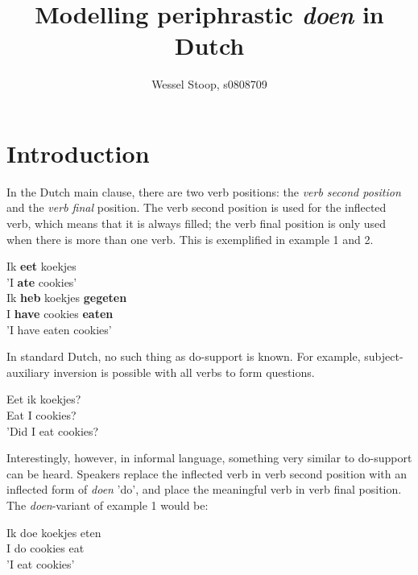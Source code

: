 \documentclass[12pt]{article}
\title{Modelling periphrastic \emph{doen} in Dutch}
\author{Wessel Stoop, s0808709}
\begin{document}
\maketitle

\section{Introduction}
In the Dutch main clause, there are two verb positions: the \emph{verb second position} and the \emph{verb final} position. The verb second position is used for the inflected verb, which means that it is always filled; the verb final position is only used when there is more than one verb. This is exemplified in example 1 and 2.

\begin{exe}
\ex \gll Ik \textbf{eet} koekjes\\
 'I \textbf{ate} cookies'\\

\ex \gll Ik \textbf{heb} koekjes \textbf{gegeten}\\
I \textbf{have} cookies \textbf{eaten}\\
\trans 'I have eaten cookies'
\end{exe}

In standard Dutch, no such thing as do-support is known. For example, subject-auxiliary inversion is possible with all verbs to form questions.

\begin{exe}
\ex \gll Eet ik koekjes? \\
Eat I cookies? \\
\trans 'Did I eat cookies?
\end{exe}

Interestingly, however, in informal language, something very similar to do-support can be heard. Speakers replace the inflected verb in verb second position with an inflected form of \emph{doen} 'do', and place the meaningful verb in verb final position. The \emph{doen}-variant of example 1 would be:

\begin{exe}
\ex \gll Ik doe koekjes eten \\
I do cookies eat\\
\trans 'I eat cookies'
\end{exe}
\end{document}
